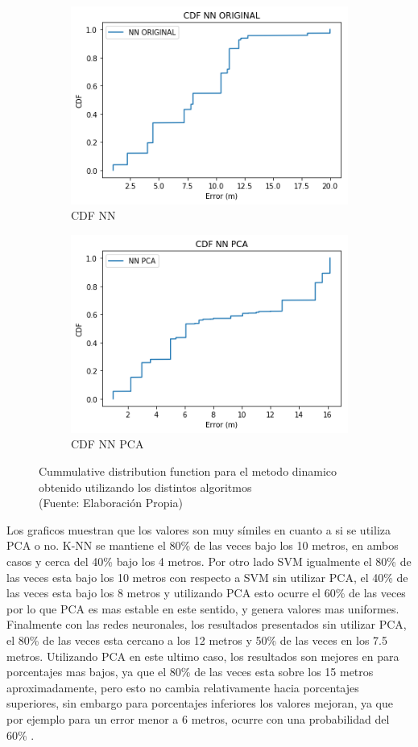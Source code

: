 \begin{figure}[ht!]
\begin{subfigure}{.5\textwidth}
  \centering
  \includegraphics[width=.8\linewidth]{figures/cdf-nn-dinamico.png}
  \caption{CDF NN}
  \label{fig:sub1}
\end{subfigure}%
\begin{subfigure}{.5\textwidth}
  \centering
  \includegraphics[width=.8\linewidth]{figures/cdf-nnPCA-dinamico.png}
  \caption{CDF NN PCA}
  \label{fig:sub2}
\end{subfigure}
\caption[abs]{Cummulative distribution function para el metodo dinamico obtenido utilizando los distintos algoritmos \\
{\scriptsize (Fuente: Elaboración Propia)}}
\label{fig:cdf-dinamicos}
\end{figure}

Los graficos muestran que los valores son muy símiles en cuanto a si se utiliza PCA o no. K-NN se mantiene el 80\% de las veces bajo los 10 metros, en ambos casos y cerca del 40\% bajo los 4 metros. Por otro lado SVM igualmente el 80\% de las veces esta bajo los 10 metros con respecto a SVM sin utilizar PCA, el 40\% de las veces esta bajo los 8 metros y utilizando PCA esto ocurre el 60\% de las veces por lo que PCA es mas estable en este sentido, y genera valores mas uniformes. Finalmente con las redes neuronales, los resultados presentados sin utilizar PCA, el 80\% de las veces esta cercano a los 12 metros y 50\% de las veces en los 7.5 metros. Utilizando PCA en este ultimo caso, los resultados son mejores en para porcentajes mas bajos, ya que el 80\% de las veces esta sobre los 15 metros aproximadamente,  pero esto no cambia relativamente hacia porcentajes superiores, sin embargo para porcentajes inferiores los valores mejoran, ya que por ejemplo para un error menor a 6 metros, ocurre con una probabilidad del 60\% .

